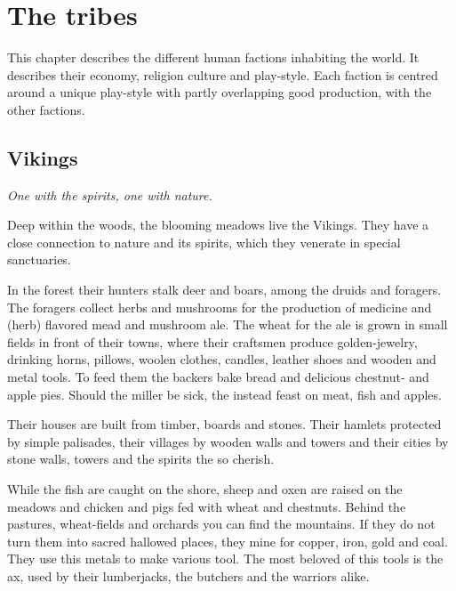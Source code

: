\documentclass[a4paper]{book}
\title{\Title}
\author{\Author}
\begin{document}
\maketitle

\tableofcontents

\chapter{The tribes}
This chapter describes the different human factions inhabiting the world. It
describes their economy, religion culture and play-style. Each faction is
centred around a unique play-style with partly overlapping good production,
with the other factions.

\section{\Gls{Vikings}}

\begin{flushright}
	\emph{One with the spirits, one with nature.}
\end{flushright}

Deep within the woods, the blooming meadows live the \gls{Vikings}. They have a
close connection to nature and its spirits, which they venerate in special
sanctuaries.

In the forest their hunters stalk deer and boars, among the druids and
foragers. The foragers collect herbs and mushrooms for the production of
medicine and (herb) flavored mead and mushroom ale. The wheat for the ale is
grown in small fields in front of their towns, where their craftsmen produce
golden-jewelry, drinking horns, pillows, woolen clothes, candles, leather shoes
and wooden and metal tools. To feed them the backers bake bread and delicious
chestnut- and apple pies. Should the miller be sick, the instead feast on meat,
fish and apples.

Their houses are built from timber, boards and stones. Their hamlets protected
by simple palisades, their villages by wooden walls and towers and their cities
by stone walls, towers and the spirits the so cherish.

While the fish are caught on the shore, sheep and oxen are raised on the
meadows and chicken and pigs fed with wheat and chestnuts. Behind the pastures,
wheat-fields and orchards you can find the mountains. If they do not turn them
into sacred hallowed places, they mine for copper, iron, gold and coal. They
use this metals to make various tool. The most beloved of this tools is the ax,
used by their lumberjacks, the butchers and the warriors alike.
\end{document}
